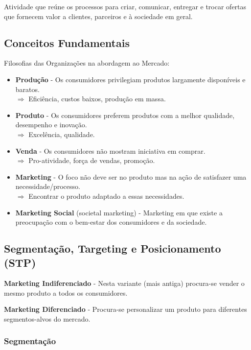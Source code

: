 \documentclass[11pt]{article}
\begin{document}
Atividade que reúne os processos para criar, comunicar, entregar e trocar ofertas que fornecem valor a clientes, parceiros e à sociedade em geral.

\subsection{Conceitos Fundamentais}

Filosofias das Organizações na abordagem ao Mercado:
\begin{itemize}[topsep=0pt]
    \item \textbf{Produção} - Os consumidores privilegiam produtos largamente disponíveis e baratos.\\[4pt]
          $\Rightarrow$ Eficiência, custos baixos, produção em massa.
    \item \textbf{Produto} - Os consumidores preferem produtos com a melhor qualidade, desempenho e inovação.\\[4pt]
          $\Rightarrow$ Excelência, qualidade.
    \item \textbf{Venda} - Os consumidores não mostram iniciativa em comprar.\\[4pt]
          $\Rightarrow$ Pro-atividade, força de vendas, promoção.
    \item \textbf{Marketing} - O foco não deve ser no produto mas na ação de satisfazer uma necessidade/processo.\\[4pt]
          $\Rightarrow$ Encontrar o produto adaptado a essas necessidades.
    \item \textbf{Marketing Social} (societal marketing) - Marketing em que existe a preocupação com o bem-estar dos consumidores e da sociedade.
\end{itemize}

\subsection{Segmentação, Targeting e Posicionamento (STP)}

\textbf{Marketing Indiferenciado} - Nesta variante (mais antiga) procura-se vender o mesmo produto a todos os consumidores.

\textbf{Marketing Diferenciado} - Procura-se personalizar um produto para diferentes segmentos-alvos do mercado.

\subsubsection{Segmentação}
\end{document}
